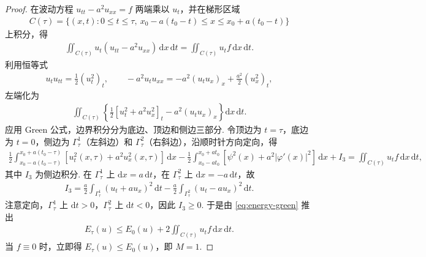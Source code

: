 \documentclass[../../main.tex]{subfiles}%
\begin{document}
\begin{proof}
在波动方程 $u_{tt}-a^2u_{xx}=f$ 两端乘以 $u_t$，并在梯形区域
\begin{align*}
C(\tau)=\{(x,t): 0\leqslant t\leqslant \tau,\ x_0-a(t_0-t)\leqslant x\leqslant x_0+a(t_0-t)\}
\end{align*}
上积分，得
\begin{align*}
\iint_{C(\tau)}u_t(u_{tt}-a^2u_{xx})\,\mathrm{d}x\,\mathrm{d}t=\iint_{C(\tau)}u_tf\,\mathrm{d}x\,\mathrm{d}t.
\end{align*}
利用恒等式
\begin{align*}
u_tu_{tt}=\frac{1}{2}(u_t^2)_t,\qquad -a^2u_tu_{xx}=-a^2(u_tu_x)_x+\frac{a^2}{2}(u_x^2)_t,
\end{align*}
左端化为
\begin{align*}
\iint_{C(\tau)}\left\{\frac{1}{2}[u_t^2+a^2u_x^2]_t-a^2(u_tu_x)_x\right\}\mathrm{d}x\,\mathrm{d}t.
\end{align*}
应用 Green 公式，边界积分分为底边、顶边和侧边三部分. 令顶边为 $t=\tau$，底边为 $t=0$，侧边为 $\Gamma_\tau^1$（左斜边）和 $\Gamma_\tau^2$（右斜边），沿顺时针方向定向，得
\begin{gather}\label{eq:energy-green}
\frac{1}{2}\int_{x_0-a(t_0-\tau)}^{x_0+a(t_0-\tau)}[u_t^2(x,\tau)+a^2u_x^2(x,\tau)]\,\mathrm{d}x -\frac{1}{2}\int_{x_0-at_0}^{x_0+at_0}[\psi^2(x)+a^2|\varphi'(x)|^2]\,\mathrm{d}x + I_3 = \iint_{C(\tau)}u_tf\,\mathrm{d}x\,\mathrm{d}t,
\end{gather}
其中 $I_3$ 为侧边积分. 在 $\Gamma_\tau^1$ 上 $\mathrm{d}x=a\,\mathrm{d}t$，在 $\Gamma_\tau^2$ 上 $\mathrm{d}x=-a\,\mathrm{d}t$，故
\begin{align*}
I_3=\frac{a}{2}\int_{\Gamma_\tau^1}(u_t+au_x)^2\,\mathrm{d}t-\frac{a}{2}\int_{\Gamma_\tau^2}(u_t-au_x)^2\,\mathrm{d}t.
\end{align*}
注意定向，$\Gamma_\tau^1$ 上 $\mathrm{d}t>0$，$\Gamma_\tau^2$ 上 $\mathrm{d}t<0$，因此 $I_3\geqslant 0$. 于是由 \eqref{eq:energy-green} 推出
\begin{align}
E_\tau(u)\leqslant E_0(u)+2\iint_{C(\tau)}u_tf\,\mathrm{d}x\,\mathrm{d}t. \label{eq:energy-inter}
\end{align}
当 $f\equiv 0$ 时，立即得 $E_\tau(u)\leqslant E_0(u)$，即 $M=1$.


\end{proof}
\end{document}
